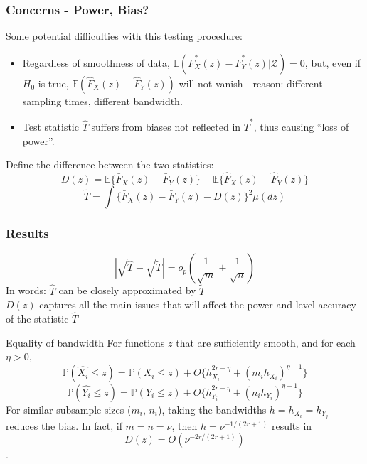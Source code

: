 \documentclass[10pt,dvipsnames,table]{beamer}
\newcommand{\Exp}{\mathds{E}}
\newcommand{\Prob}{\mathds{P}}
\begin{document}
\begin{frame}
\frametitle{Concerns - Power, Bias?}
Some potential difficulties with this testing procedure:
\begin{itemize}
\item \pause Regardless of smoothness of data, $\Exp(\bar{F}^*_X(z) - \bar{F}^*_Y(z) | \mathcal{Z}) = 0$, but, even if $H_0$ is true, $\Exp(\hat{F}_X(z) - \hat{F}_Y(z))$ will not vanish - reason: different sampling times, different bandwidth.
\item \pause Test statistic $\hat{T}$ suffers from biases not reflected in $\bar{T}^*$, thus causing ``loss of power''.  
\end{itemize}
\pause
Define the difference between the two statistics: 
\[D(z) = \Exp\{\bar{F}_X(z) - \bar{F}_Y(z)\} - \Exp\{\hat{F}_X(z) - \hat{F}_Y(z)\} \]
\[\widetilde{T} = \int \{\bar{F}_X(z) - \bar{F}_Y(z) - D(z) \}^2 \mu(dz) \]
\end{frame}

\begin{frame}
\frametitle{Results}
\begin{theorem}
\[|\sqrt{\hat{T}} - \sqrt{\widetilde{T}}| = o_p(\frac{1}{\sqrt{m}} + \frac{1}{\sqrt{n}})\]
In words: $\hat{T}$ can be closely approximated by $\widetilde{T}$\\
$D(z)$ captures all the main issues that will affect the power and level accuracy of the statistic $\hat{T}$
\end{theorem}
\pause
\begin{block}{Equality of bandwidth}
For functions $z$ that are sufficiently smooth, and for each $\eta > 0$,
\[\Prob(\hat{X_i} \leq z) = \Prob(X_i \leq z) + O\{h_{X_i}^{2r - \eta} + (m_ih_{X_i})^{\eta - 1} \}\]
\[\Prob(\hat{Y_i} \leq z) = \Prob(Y_i \leq z) + O\{h_{Y_i}^{2r - \eta} + (n_ih_{Y_i})^{\eta - 1} \}\]
For similar subsample sizes ($m_i$, $n_i$), taking the bandwidths $h = h_{X_i} = h_{Y_j}$ reduces the bias. 
\pause In fact, if $m=n=\nu$, then $h=\nu^{-1/(2r+1)}$ results in \[D(z) = O(\nu^{-2r/(2r+1)})\]. 
\end{block}
\end{frame}
\end{document}
